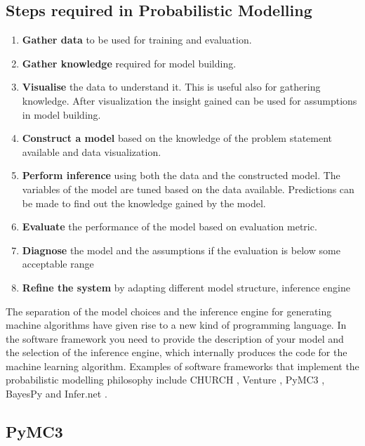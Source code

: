 \subsection*{Steps required in Probabilistic Modelling}
\label{sub:steps}
\begin{enumerate}
	\item \textbf{Gather data} to be used for training and evaluation.
    \item \textbf{Gather knowledge} required for model building.
    \item \textbf{Visualise} the data to understand it. This is useful also for gathering knowledge. After visualization the insight gained can be used for assumptions in model building.
    \item \textbf{Construct a model} based on the knowledge of the problem statement available and data visualization. 
    \item \textbf{Perform inference} using both the data and the constructed model. The variables of the model are tuned based on the data available. Predictions can be made to find out the knowledge gained by the model.
    \item \textbf{Evaluate} the performance of the model based on evaluation metric.
    \item \textbf{Diagnose} the model and the assumptions if the evaluation is below some acceptable range
    \item \textbf{Refine the system} by adapting different model structure, inference engine

\end{enumerate}


The separation of the model choices and the inference engine for generating machine algorithms have given rise to a new kind of programming language.
In the software framework you need to provide the description of your model and the selection of the inference engine, which internally produces the code for the machine learning algorithm.
Examples of software frameworks that implement the probabilistic modelling philosophy  include CHURCH \cite{goodman_church_2012}, Venture \cite{mansinghka_venture_2014}, PyMC3 \cite{salvatier_probabilistic_2015}, BayesPy \cite{luttinen_bayespy_2014} and Infer.net \cite{minka_2010}.

\subsection{PyMC3}


